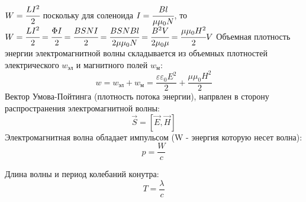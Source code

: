 \documentclass[twoside, a4paperpt, fleqn]{extarticle}
\begin{document}
$W = \cfrac{L I^2}{2} $ поскольку для соленоида $I = \cfrac{B l}{\mu \mu_0 N}$, то $W = \cfrac{L I^2}{2} = \cfrac{\Phi I}{2} = \cfrac{B S N I}{2} = \cfrac{B S N B l}{2 \mu \mu_0 N} = \cfrac{B^2 V}{2 \mu_0 \mu } = \cfrac{\mu \mu_0 H^2}{2} V$
Объемная плотность энергии электромагнитной волны складывается из объемных плотностей электрического $w_{\text{эл}}$ и магнитного полей $w_{\text{м}}$:
\begin{equation*}
    w = w_{\text{эл}} + w_{\text{м}} = \frac{\varepsilon \varepsilon_0 E^2}{2} + \frac{\mu \mu_0 H^2}{2}
\end{equation*}
Вектор Умова-Пойтинга (плотность потока энергии), напрвлен в сторону распространения электромагнитной волны:
\begin{equation*}
    \vec{S} = [ \vec{E}, \vec{H}]
\end{equation*}
Электромагнитная волна обладает импульсом (W - энергия которую несет волна):
\begin{equation}
    p = \frac{W}{c}
\end{equation}

Длина волны и период колебаний конутра:
\begin{equation*}
    T = \frac{\lambda}{c}
\end{equation*}
\end{document}
